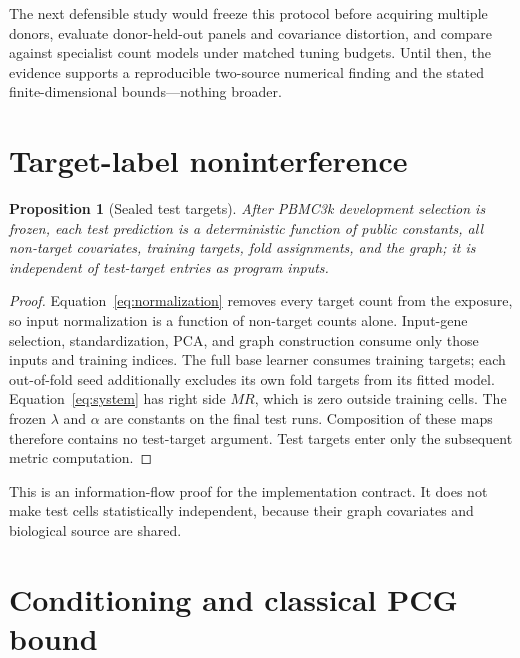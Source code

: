 \documentclass[10pt,letterpaper,twoside]{article}
\newtheorem{proposition}{Proposition}
\begin{document}
The next defensible study would freeze this protocol before acquiring multiple
donors, evaluate donor-held-out panels and covariance distortion, and compare
against specialist count models under matched tuning budgets.  Until then, the
evidence supports a reproducible two-source numerical finding and the stated
finite-dimensional bounds---nothing broader.

\appendix

\section{Target-label noninterference}

\begin{proposition}[Sealed test targets]
After PBMC3k development selection is frozen, each test prediction is a
deterministic function of public constants, all non-target covariates, training
targets, fold assignments, and the graph; it is independent of test-target
entries as program inputs.
\end{proposition}
\begin{proof}
Equation~\eqref{eq:normalization} removes every target count from the exposure,
so input normalization is a function of non-target counts alone.  Input-gene
selection, standardization, PCA, and graph construction consume only those
inputs and training indices.  The full base learner consumes training targets;
each out-of-fold seed additionally excludes its own fold targets from its fitted
model.  Equation~\eqref{eq:system} has right side $MR$, which is zero outside
training cells.  The frozen $\lambda$ and $\alpha$ are constants on the final
test runs.  Composition of these maps therefore contains no test-target
argument.  Test targets enter only the subsequent metric computation.
\end{proof}

This is an information-flow proof for the implementation contract.  It does
not make test cells statistically independent, because their graph covariates
and biological source are shared.

\section{Conditioning and classical PCG bound}
\end{document}
